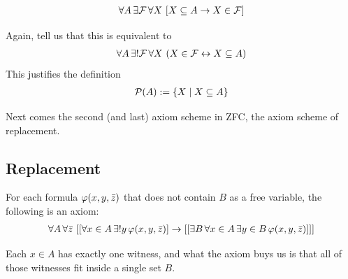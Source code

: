 \begin{baxiom}
    \begin{align*}
        \forall A \, \exists \mathcal{F} \, \forall X \, \left[ X \subseteq A \to X \in \mathcal{F} \right]
    \end{align*}
\end{baxiom}

Again,  tell us that this is equivalent to
\begin{align*}
    \forall A \, \exists! \mathcal{F} \, \forall X \, \left( X \in \mathcal{F} \leftrightarrow X \subseteq A \right)
\end{align*}
This justifies the definition
\begin{align*}
    \mathcal{P}(A) := \left\{ X \; \middle\vert \; X \subseteq A \right\}
\end{align*}

Next comes the second (and last) axiom scheme in ZFC, the axiom scheme of replacement.

\subsection{Replacement}

\begin{baxiom}\label{ZFC:Replacement}
    For each formula $\varphi\!\left( x, y, \bar{z} \right)$ that does not contain $B$ as a free variable, the following is an axiom:
    \begin{align*}
        \forall A \, \forall \bar{z} \, \left[ 
            \left[ \forall x \in A \, \exists! y \, \varphi\!\left( x, y, \bar{z} \right) \right]
            \to
            \left[ \left[ \exists B \, \forall x \in A \, \exists y \in B \, \varphi\!\left( x, y, \bar{z} \right) \right] \right]
         \right]
    \end{align*}
\end{baxiom}

Each $x \in A$ has exactly one witness, and what the axiom buys us is that all of those witnesses fit inside a single set $B$.

